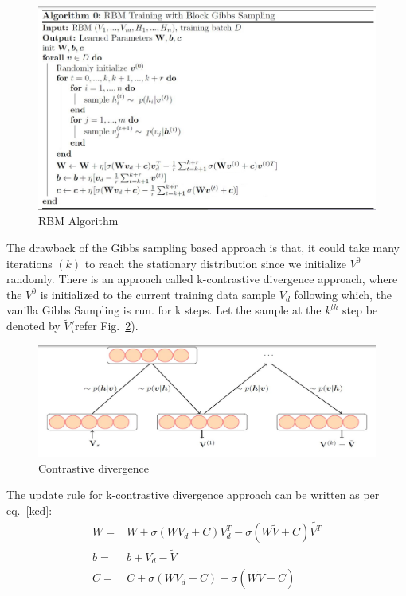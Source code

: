 \begin{spacing}{1.5}
\begin{figure}[h]
    \centering
    \includegraphics[scale=0.65]{Chapters/Figures/lect_20_slide_54_RBM_algorithm.JPG}
    \caption{RBM Algorithm}
    \label{fig:rbm_algo}
\end{figure}

The drawback of the Gibbs sampling based approach is that, it could take many iterations $(k)$ to reach the stationary distribution since we initialize $V^{0}$ randomly. There is an approach called k-contrastive divergence approach, where the $V^{0}$ is initialized to the current training data sample $V_{d}$ following which, the vanilla Gibbs Sampling is run. for k steps. Let the sample at the $k^{th}$ step be denoted by $\tilde{V}$(refer Fig.~\ref{fig:Conrastive_divergence}). 

\begin{figure}[h]
    \centering
    \includegraphics[scale=0.6]{Chapters/Figures/lect_20_slide_58_Conrastive_divergence.JPG}
    \caption{Contrastive divergence}
    \label{fig:Conrastive_divergence}
\end{figure}

The update rule for k-contrastive divergence approach can be written as per eq.~\ref{kcd}:
\begin{equation}
\label{kcd}
    \begin{aligned}
    W=&W+\sigma(WV_{d}+C)V_{d}^{T}-\sigma(W\tilde{V}+C)\tilde{V^{T}}\\
    b=&b+V_{d}-\tilde{V}\\
    C=&C+\sigma(WV_{d}+C)-\sigma(W\tilde{V}+C)
    \end{aligned}
\end{equation}


\end{spacing}
